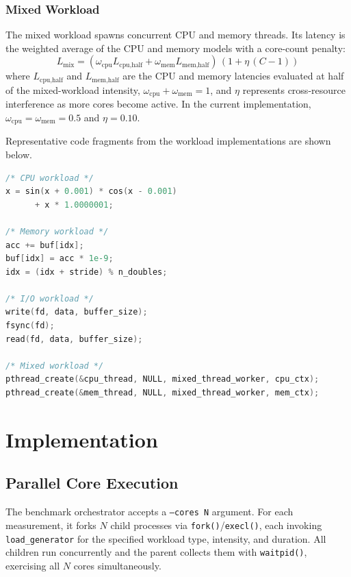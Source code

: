\documentclass[conference]{IEEEtran}
\begin{document}
\subsubsection{Mixed Workload}
The mixed workload spawns concurrent CPU and memory threads.  Its latency is
the weighted average of the CPU and memory models with a core-count penalty:
\begin{equation}
      L_{\text{mix}} = (\omega_{\text{cpu}}L_{\text{cpu,half}}
                                                 + \omega_{\text{mem}}L_{\text{mem,half}})
                                                 \,(1 + \eta\,(C-1))
\end{equation}
where $L_{\text{cpu,half}}$ and $L_{\text{mem,half}}$ are the CPU and memory
latencies evaluated at half of the mixed-workload intensity,
$\omega_{\text{cpu}} + \omega_{\text{mem}} = 1$, and $\eta$ represents
cross-resource interference as more cores become active.  In the current
implementation, $\omega_{\text{cpu}} = \omega_{\text{mem}} = 0.5$ and
$\eta = 0.10$.

Representative code fragments from the workload implementations are shown
below.
\begin{lstlisting}[language=C,basicstyle=\ttfamily\scriptsize,columns=fullflexible,breaklines=true,breakatwhitespace=false,postbreak=\mbox{\textcolor{gray}{$\hookrightarrow$}\space}]
/* CPU workload */
x = sin(x + 0.001) * cos(x - 0.001)
      + x * 1.0000001;

/* Memory workload */
acc += buf[idx];
buf[idx] = acc * 1e-9;
idx = (idx + stride) % n_doubles;

/* I/O workload */
write(fd, data, buffer_size);
fsync(fd);
read(fd, data, buffer_size);

/* Mixed workload */
pthread_create(&cpu_thread, NULL, mixed_thread_worker, cpu_ctx);
pthread_create(&mem_thread, NULL, mixed_thread_worker, mem_ctx);
\end{lstlisting}

\section{Implementation}
\label{sec:implementation}

\subsection{Parallel Core Execution}

The benchmark orchestrator accepts a \texttt{--cores N} argument.  For each
measurement, it forks $N$ child processes via \texttt{fork()}/\texttt{execl()},
each invoking \texttt{load\_generator} for the specified workload type,
intensity, and duration.  All children run concurrently and the parent
collects them with \texttt{waitpid()}, exercising all $N$ cores
simultaneously.
\end{document}
